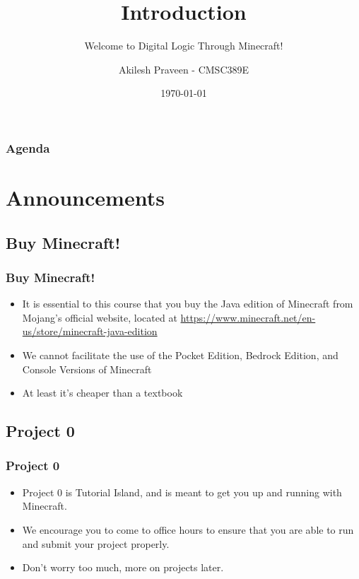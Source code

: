 \documentclass{beamer}
\title{Introduction}
\subtitle{Welcome to Digital Logic Through Minecraft!}
\author[A Praveen]{Akilesh Praveen - CMSC389E}
\institute{UMD}
\date{\today}
\begin{document}
    \begin{frame}
        \titlepage
    \end{frame}
    
    \begin{frame}
        \frametitle{Agenda}
        \tableofcontents
    \end{frame}
    
    \section{Announcements}
        \subsection{Buy Minecraft!}
            
            \begin{frame}
                \frametitle{Buy Minecraft!}
                \begin{itemize}
                    \item It is essential to this course that you buy the Java edition of Minecraft from Mojang's official website, located at \href{https://www.minecraft.net/en-us/store/minecraft-java-edition//}{https://www.minecraft.net/en-us/store/minecraft-java-edition}
                    \item We cannot facilitate the use of the Pocket Edition, Bedrock Edition, and Console Versions of Minecraft
                    \item At least it's cheaper than a textbook
                \end{itemize}
            \end{frame}
        
            
        \subsection{Project 0}
            
            \begin{frame}
                \frametitle{Project 0}
                \begin{itemize}
                    \item Project 0 is Tutorial Island, and is meant to get you up and running with Minecraft.
                    \item We encourage you to come to office hours to ensure that you are able to run and submit your project properly.
                    \item Don't worry too much, more on projects later.
                \end{itemize}
            \end{frame}
            
\end{document}
